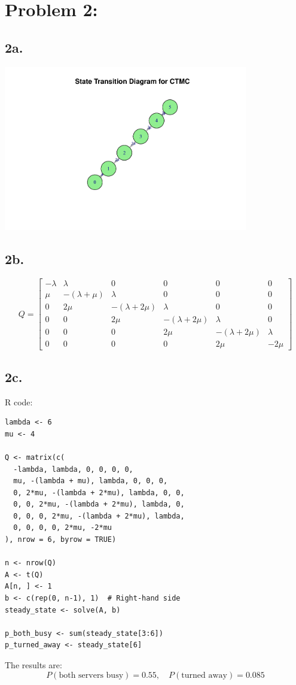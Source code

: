 \documentclass[12pt]{article}
\begin{document}
\section*{Problem 2:}

\subsection*{2a.}

\begin{center}
    \includegraphics[width=0.8\textwidth]{project2_2a.pdf}
\end{center}

\subsection*{2b.}

\[
Q =
\begin{bmatrix}
-\lambda & \lambda & 0 & 0 & 0 & 0 \\
\mu & -(\lambda + \mu) & \lambda & 0 & 0 & 0 \\
0 & 2\mu & -(\lambda + 2\mu) & \lambda & 0 & 0 \\
0 & 0 & 2\mu & -(\lambda + 2\mu) & \lambda & 0 \\
0 & 0 & 0 & 2\mu & -(\lambda + 2\mu) & \lambda \\
0 & 0 & 0 & 0 & 2\mu & -2\mu
\end{bmatrix}
\]

\subsection*{2c.}

R code:

\begin{verbatim}
lambda <- 6  
mu <- 4      

Q <- matrix(c(
  -lambda, lambda, 0, 0, 0, 0,
  mu, -(lambda + mu), lambda, 0, 0, 0,
  0, 2*mu, -(lambda + 2*mu), lambda, 0, 0,
  0, 0, 2*mu, -(lambda + 2*mu), lambda, 0,
  0, 0, 0, 2*mu, -(lambda + 2*mu), lambda,
  0, 0, 0, 0, 2*mu, -2*mu
), nrow = 6, byrow = TRUE)

n <- nrow(Q)
A <- t(Q)
A[n, ] <- 1  
b <- c(rep(0, n-1), 1)  # Right-hand side
steady_state <- solve(A, b)

p_both_busy <- sum(steady_state[3:6])  
p_turned_away <- steady_state[6]       
\end{verbatim}

The results are:
\[
P(\text{both servers busy}) = 0.55, \quad P(\text{turned away}) = 0.085
\]
\end{document}
